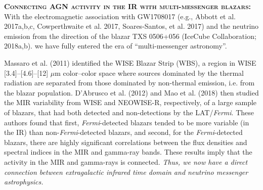 \documentclass[12pt]{article}
\begin{document}
\smallskip
\smallskip
\noindent
\textbf{\textsc{Connecting AGN activity in the IR with multi-messenger blazars: }}
With the electromagnetic association with GW1708017 (e.g., Abbott et
al. 2017a,b,c, Cowperthwaite et al. 2017, Soares-Santos, et
al. 2017)
and the neutrino emission from the direction of the blazar TXS 0506+056 
(IceCube Collaboration; 2018a,b).
we have  fully entered the era of ``multi-messenger astronomy''. 

\smallskip
\smallskip
\noindent
Massaro et al. (2011) identified the WISE Blazar Strip (WBS), a region in WISE [3.4]–[4.6]–[12] $\mu$m color–color space where sources dominated by the thermal radiation are separated from those dominated by non-thermal emission, i.e. from the blazar population. D'Abrusco et al. (2012) and Mao et al. (2018) then studied the MIR variability from WISE and NEOWISE-R, respectively, of a large sample of blazars, that had both detected and non-detections by the LAT/{\it Fermi}. These authors found that first, {\it Fermi}-detected blazars tended to be more variable (in the IR) than non-{\it Fermi}-detected blazars, and second, for the {\it Fermi}-detected blazars, there are highly significant correlations between the flux densities and spectral indices in the MIR and gamma-ray bands. These results imply that the activity in the MIR and gamma-rays is connected. 
{\it Thus, we now have a direct connection between extragalactic infrared time domain and neutrino messenger astrophysics.}



\hspace{-78pt}

\smallskip
\smallskip
\noindent
%
\end{document}
